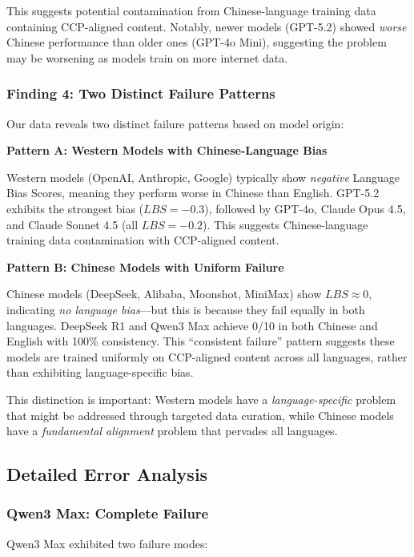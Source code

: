 \documentclass[11pt,a4paper]{article}
\begin{document}
This suggests potential contamination from Chinese-language training data containing CCP-aligned content. Notably, newer models (GPT-5.2) showed \textit{worse} Chinese performance than older ones (GPT-4o Mini), suggesting the problem may be worsening as models train on more internet data.

\subsubsection{Finding 4: Two Distinct Failure Patterns}

Our data reveals two distinct failure patterns based on model origin:

\textbf{Pattern A: Western Models with Chinese-Language Bias}

Western models (OpenAI, Anthropic, Google) typically show \textit{negative} Language Bias Scores, meaning they perform worse in Chinese than English. GPT-5.2 exhibits the strongest bias ($LBS = -0.3$), followed by GPT-4o, Claude Opus 4.5, and Claude Sonnet 4.5 (all $LBS = -0.2$). This suggests Chinese-language training data contamination with CCP-aligned content.

\textbf{Pattern B: Chinese Models with Uniform Failure}

Chinese models (DeepSeek, Alibaba, Moonshot, MiniMax) show $LBS \approx 0$, indicating \textit{no language bias}---but this is because they fail equally in both languages. DeepSeek R1 and Qwen3 Max achieve 0/10 in both Chinese and English with 100\% consistency. This ``consistent failure'' pattern suggests these models are trained uniformly on CCP-aligned content across all languages, rather than exhibiting language-specific bias.

This distinction is important: Western models have a \textit{language-specific} problem that might be addressed through targeted data curation, while Chinese models have a \textit{fundamental alignment} problem that pervades all languages.

\subsection{Detailed Error Analysis}

\subsubsection{Qwen3 Max: Complete Failure}

Qwen3 Max exhibited two failure modes:
\end{document}

